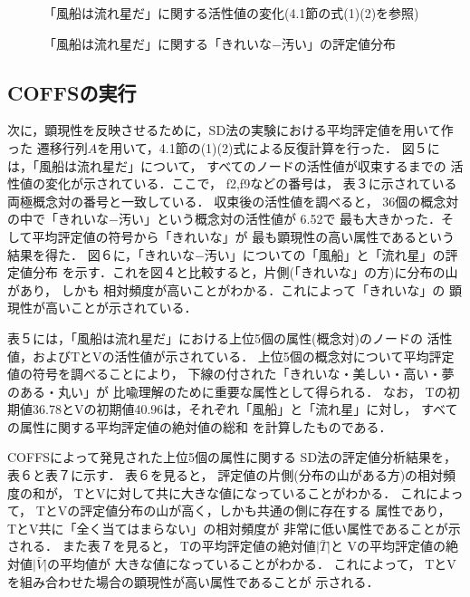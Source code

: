 \begin{figure}[t]
\begin{center}
\end{center}
\vspace*{-1mm}

\caption{「風船は流れ星だ」に関する活性値の変化(4.1節の式(1)(2)を参照)}

\begin{center}
\end{center}

\vspace*{-1mm}

\caption{「風船は流れ星だ」に関する「きれいな−汚い」の評定値分布}

\vspace*{-0.5mm}

\end{figure}




\subsection{COFFSの実行}

次に，顕現性を反映させるために，SD法の実験における平均評定値を用いて作った
遷移行列$A$を用いて，4.1節の(1)(2)式による反復計算を行った．
図５には，「風船は流れ星だ」について，
すべてのノードの活性値が収束するまでの
活性値の変化が示されている．ここで，
f2,\hspace{0.1cm}f9などの番号は，
表３に示されている両極概念対の番号と一致している．
収束後の活性値を調べると，
36個の概念対の中で「きれいな−汚い」という概念対の活性値が
6.52で
最も大きかった．そして平均評定値の符号から「きれいな」が
最も顕現性の高い属性であるという結果を得た．
図６に，「きれいな−汚い」についての「風船」と「流れ星」の評定値分布
を示す．これを図４と比較すると，片側(「きれいな」の方)に分布の山があり，
しかも
相対頻度が高いことがわかる．これによって「きれいな」の
顕現性が高いことが示されている．

表５には，「風船は流れ星だ」における上位5個の属性(概念対)のノードの
活性値，およびTとVの活性値が示されている．
上位5個の概念対について平均評定値の符号を調べることにより，
下線の付された「きれいな・美しい・高い・夢のある・丸い」が
比喩理解のために重要な属性として得られる．
なお，
Tの初期値36.78とVの初期値40.96は，それぞれ「風船」と「流れ星」に対し，
すべての属性に関する平均評定値の絶対値の総和
を計算したものである．

COFFSによって発見された上位5個の属性に関する
SD法の評定値分析結果を，表６と表７に示す．
表６を見ると，
評定値の片側(分布の山がある方)の相対頻度の和が，
TとVに対して共に大きな値になっていることがわかる．
これによって，
TとVの評定値分布の山が高く，しかも共通の側に存在する
属性であり，
TとV共に「全く当てはまらない」の相対頻度が
非常に低い属性であることが示される．
また表７を見ると，
Tの平均評定値の絶対値\(\vert\bar{T}\vert\)と
Vの平均評定値の絶対値\(\vert\bar{V}\vert\)の平均値が
大きな値になっていることがわかる．
これによって，
TとVを組み合わせた場合の顕現性が高い属性であることが
示される．


